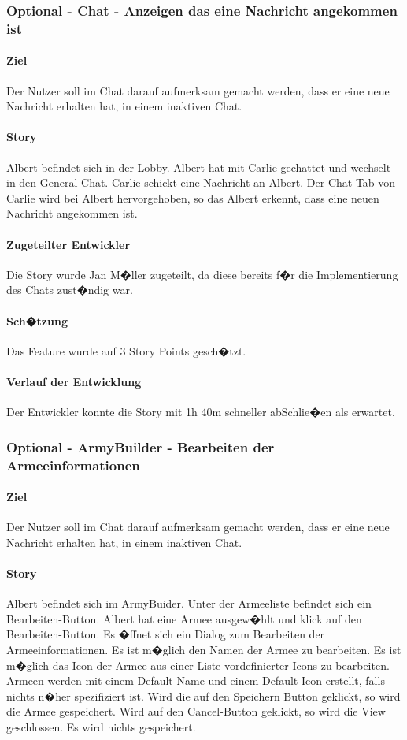 \documentclass[12pt, titlepage]{scrartcl}
\begin{document}
			\subsubsection{Optional - Chat - Anzeigen das eine Nachricht angekommen ist}
			\paragraph{Ziel} Der Nutzer soll im Chat darauf aufmerksam gemacht werden, dass er eine neue Nachricht erhalten hat, in einem inaktiven Chat.
			\paragraph{Story}Albert befindet sich in der Lobby. Albert hat mit Carlie gechattet und wechselt in den General-Chat. Carlie schickt eine Nachricht an Albert. Der Chat-Tab von Carlie wird bei Albert hervorgehoben, so das Albert erkennt, dass eine neuen Nachricht angekommen ist.
			\paragraph{Zugeteilter Entwickler} Die Story wurde Jan M�ller zugeteilt, da diese bereits f�r die Implementierung des Chats zust�ndig war. 
			\paragraph{Sch�tzung}
			Das Feature wurde auf 3 Story Points gesch�tzt.
			\paragraph{Verlauf der Entwicklung} 
			Der Entwickler konnte die Story mit 1h 40m schneller abSchlie�en als erwartet.  
			\subsubsection{Optional - ArmyBuilder - Bearbeiten der Armeeinformationen}
			\paragraph{Ziel} Der Nutzer soll im Chat darauf aufmerksam gemacht werden, dass er eine neue Nachricht erhalten hat, in einem inaktiven Chat.
			\paragraph{Story} Albert befindet sich im ArmyBuider. Unter der Armeeliste befindet sich ein Bearbeiten-Button. Albert hat eine Armee ausgew�hlt und klick auf den Bearbeiten-Button. Es �ffnet sich ein Dialog zum Bearbeiten der Armeeinformationen. Es ist m�glich den Namen der Armee zu bearbeiten. Es ist m�glich das Icon der Armee aus einer Liste vordefinierter Icons zu bearbeiten. Armeen werden mit einem Default Name und einem Default Icon erstellt, falls nichts n�her spezifiziert ist. Wird die auf den Speichern Button geklickt, so wird die Armee gespeichert. Wird auf den Cancel-Button geklickt, so wird die View geschlossen. Es wird nichts gespeichert.
\end{document}
